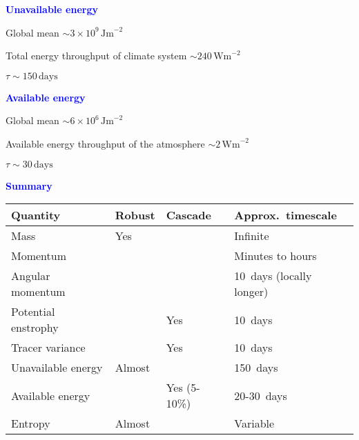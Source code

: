 \documentclass[a4]{seminar}
\newcommand{\B}[1]{\textcolor{blue}{#1}}
\begin{document}

\begin{slide}

\B{\bf Unavailable energy}

\vspace{2mm}

Global mean \( \sim 3 \times 10^9 \, \mathrm{Jm}^{-2} \)

Total energy throughput of climate system \( \sim 240 \, \mathrm{Wm}^{-2} \)

\( \tau \sim 150 \, \mathrm{days} \)



\end{slide}


\begin{slide}

\B{\bf Available energy}

Global mean \( \sim 6 \times 10^6 \, \mathrm{Jm}^{-2} \)

Available energy throughput of the atmosphere \( \sim 2 \, \mathrm{Wm}^{-2} \)

\( \tau \sim 30 \, \mathrm{days} \)



\end{slide}


\begin{slide}


\B{\bf Summary}

\vspace{2mm}

\begin{tabular}{|l|l|l|l|}
\hline
Quantity    & Robust     & Cascade & Approx.\ timescale\\
\hline
\hline
Mass        & Yes        &         & Infinite \\  
\hline
Momentum    &            &         & Minutes to hours \\
Angular momentum &       &         & 10~days (locally longer) \\
\hline
Potential enstrophy &    & Yes     & 10~days \\
Tracer variance     &    & Yes     & 10~days \\
\hline
Unavailable energy & Almost &      & 150~days \\
Available energy   &     & Yes (5-10\%) & 20-30~days \\
\hline
Entropy      & Almost   &         & Variable \\
\hline
\end{tabular}




\end{slide}
\end{document}
